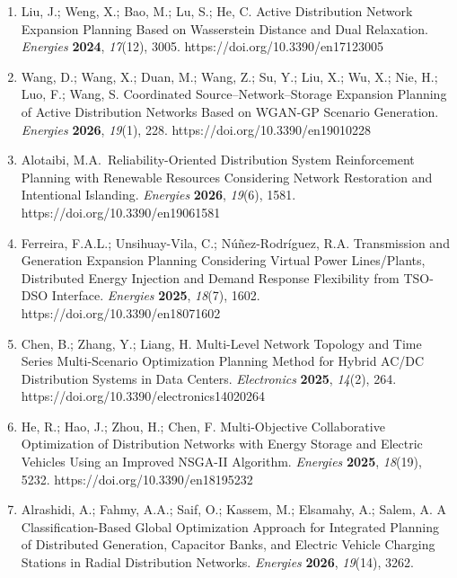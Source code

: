 \documentclass[
  10pt,
  a4paper,
]{article}
\begin{document}
\begin{enumerate}
  Saldaña-González, A.E.; Aragüés-Peñalba, M.; Gadelha, V.; Sumper, A.
  Review of Active Distribution Network Planning: Elements in
  Optimization Models and Generative AI Applications. \emph{Energies}
  \textbf{2026}, \emph{19}(1), 116. https://doi.org/10.3390/en19010116
\item
  Liu, J.; Weng, X.; Bao, M.; Lu, S.; He, C. Active Distribution Network
  Expansion Planning Based on Wasserstein Distance and Dual Relaxation.
  \emph{Energies} \textbf{2024}, \emph{17}(12), 3005.
  https://doi.org/10.3390/en17123005
\item
  Wang, D.; Wang, X.; Duan, M.; Wang, Z.; Su, Y.; Liu, X.; Wu, X.; Nie,
  H.; Luo, F.; Wang, S. Coordinated Source--Network--Storage Expansion
  Planning of Active Distribution Networks Based on WGAN-GP Scenario
  Generation. \emph{Energies} \textbf{2026}, \emph{19}(1), 228.
  https://doi.org/10.3390/en19010228
\item
  Alotaibi, M.A.~Reliability-Oriented Distribution System Reinforcement
  Planning with Renewable Resources Considering Network Restoration and
  Intentional Islanding. \emph{Energies} \textbf{2026}, \emph{19}(6),
  1581. https://doi.org/10.3390/en19061581
\item
  Ferreira, F.A.L.; Unsihuay-Vila, C.; Núñez-Rodríguez, R.A.
  Transmission and Generation Expansion Planning Considering Virtual
  Power Lines/Plants, Distributed Energy Injection and Demand Response
  Flexibility from TSO-DSO Interface. \emph{Energies} \textbf{2025},
  \emph{18}(7), 1602. https://doi.org/10.3390/en18071602
\item
  Chen, B.; Zhang, Y.; Liang, H. Multi-Level Network Topology and Time
  Series Multi-Scenario Optimization Planning Method for Hybrid AC/DC
  Distribution Systems in Data Centers. \emph{Electronics}
  \textbf{2025}, \emph{14}(2), 264.
  https://doi.org/10.3390/electronics14020264
\item
  He, R.; Hao, J.; Zhou, H.; Chen, F. Multi-Objective Collaborative
  Optimization of Distribution Networks with Energy Storage and Electric
  Vehicles Using an Improved NSGA-II Algorithm. \emph{Energies}
  \textbf{2025}, \emph{18}(19), 5232. https://doi.org/10.3390/en18195232
\item
  Alrashidi, A.; Fahmy, A.A.; Saif, O.; Kassem, M.; Elsamahy, A.; Salem,
  A. A Classification-Based Global Optimization Approach for Integrated
  Planning of Distributed Generation, Capacitor Banks, and Electric
  Vehicle Charging Stations in Radial Distribution Networks.
  \emph{Energies} \textbf{2026}, \emph{19}(14), 3262.

\end{enumerate}
\end{document}
